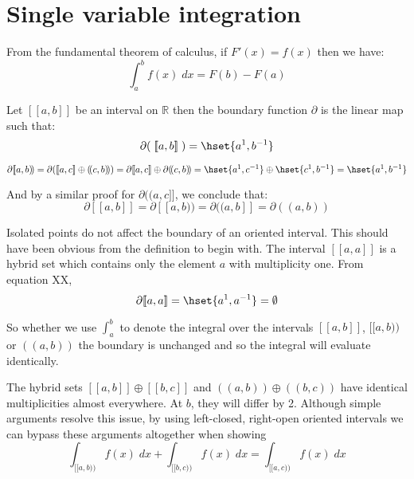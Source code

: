 %
%

\section{Single variable integration}

From the fundamental theorem of calculus, if $F'(x) = f(x)$ then we have:
\begin{equation}
	\int_a^b f(x) \; dx = F(b) - F(a)
\end{equation}


\begin{definition}
	Let $[\![ a,b ]\!]$ be an interval on $\mathbb{R}$ then the boundary function $\partial$ is the linear map such that:
	\begin{equation}
		\partial( \;[\![a,b]\!]\; ) = \hset{ a^1, b^{-1} }
	\end{equation}
\end{definition}


$\partial [\![a,b)\!) = \partial ( [\![a,c]\!] \oplus (\!(c,b)\!) ) = \partial [\![a,c]\!] \oplus \partial (\!(c,b)\!) =  \hset{ a^1, c^{-1} } \oplus \hset{ c^1, b^{-1} } = \hset{a^1, b^{-1} }$


And by a similar proof for $\partial (\!(a,c]\!]$, we conclude that:
\begin{equation}
	\partial [\![a,b]\!] = \partial [\![a,b)\!) = \partial (\!(a,b]\!] = \partial (\!(a,b)\!)
\end{equation}


Isolated points do not affect the boundary of an oriented interval.
This should have been obvious from the definition to begin with.
The interval $[\![ a,a ]\!]$ is a hybrid set which contains only the element $a$ with multiplicity one.
From equation XX,
\begin{equation}
	\partial [\![ a,a ]\!] = \hset{a^1, a^{-1}} = \emptyset
\end{equation}

So whether we use $\int_a^b$ to denote the integral over the intervals $[\![a,b]\!]$, $[\![a,b)\!)$ or  $(\!(a,b)\!)$ the boundary is unchanged and so the integral will evaluate identically.

The hybrid sets $[\![a,b]\!] \oplus [\![b,c]\!]$ and $(\!(a,b)\!) \oplus (\!(b,c)\!)$ have identical multiplicities almost everywhere.
At $b$, they will differ by 2. 
Although simple arguments resolve this issue, by using left-closed, right-open oriented intervals we can bypass these arguments altogether when showing
\begin{equation}
	\int_{[\![a,b)\!)} f(x) \; dx + \int_{[\![b,c)\!)} f(x) \; dx = \int_{[\![a,c)\!)} f(x) \; dx
\end{equation}